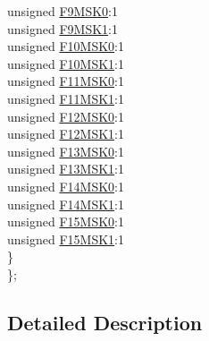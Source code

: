\begin{DoxyCompactItemize}
\begin{tabbing}
\>\>unsigned \hyperlink{structtag_c1_f_m_s_k_s_e_l2_b_i_t_s_a5369fb75b960056abfeb10f83ae06ca9}{F9MSK0}:1\\
\>\>unsigned \hyperlink{structtag_c1_f_m_s_k_s_e_l2_b_i_t_s_a0a50875460baa60f96ea09203b5aa366}{F9MSK1}:1\\
\>\>unsigned \hyperlink{structtag_c1_f_m_s_k_s_e_l2_b_i_t_s_a21decb0da8dba6ca537b4a8a1f246f29}{F10MSK0}:1\\
\>\>unsigned \hyperlink{structtag_c1_f_m_s_k_s_e_l2_b_i_t_s_a8f775a19c49b8476ab5bc7bd47754bd1}{F10MSK1}:1\\
\>\>unsigned \hyperlink{structtag_c1_f_m_s_k_s_e_l2_b_i_t_s_a3c47803e256bbc465af37fe5e206df71}{F11MSK0}:1\\
\>\>unsigned \hyperlink{structtag_c1_f_m_s_k_s_e_l2_b_i_t_s_adcaad4612ad17713c6b95f74d96e1b21}{F11MSK1}:1\\
\>\>unsigned \hyperlink{structtag_c1_f_m_s_k_s_e_l2_b_i_t_s_a3b4a47b983bc53f75674ca8e6addbdbb}{F12MSK0}:1\\
\>\>unsigned \hyperlink{structtag_c1_f_m_s_k_s_e_l2_b_i_t_s_ab5b1457ace073a91a32895138412d98a}{F12MSK1}:1\\
\>\>unsigned \hyperlink{structtag_c1_f_m_s_k_s_e_l2_b_i_t_s_a20953490bc863dbaeb168c1736963cc5}{F13MSK0}:1\\
\>\>unsigned \hyperlink{structtag_c1_f_m_s_k_s_e_l2_b_i_t_s_a3dc54dff163d977993577589b8b7728a}{F13MSK1}:1\\
\>\>unsigned \hyperlink{structtag_c1_f_m_s_k_s_e_l2_b_i_t_s_a35d58fc54faded9e6c730b096fe2867f}{F14MSK0}:1\\
\>\>unsigned \hyperlink{structtag_c1_f_m_s_k_s_e_l2_b_i_t_s_ab95583cb74fadfdd8b0751a063cd5914}{F14MSK1}:1\\
\>\>unsigned \hyperlink{structtag_c1_f_m_s_k_s_e_l2_b_i_t_s_a68478b714c3054364436086f6da56127}{F15MSK0}:1\\
\>\>unsigned \hyperlink{structtag_c1_f_m_s_k_s_e_l2_b_i_t_s_a9d2b30a0f02718f2156adf828d0e4cbe}{F15MSK1}:1\\
\>\} \\
\}; \\

\end{tabbing}\end{DoxyCompactItemize}


\subsection{Detailed Description}


